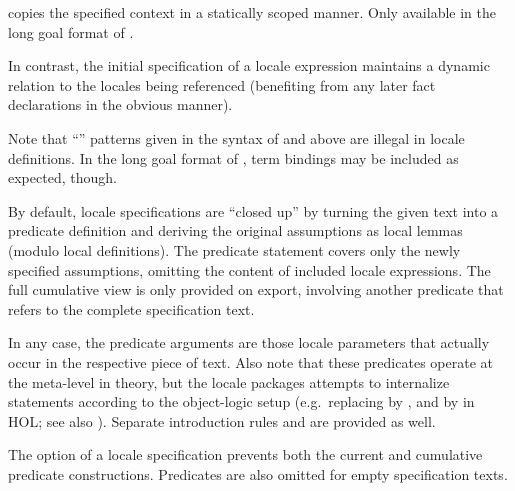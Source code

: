 \begin{isabellebody}
\begin{isamarkuptext}
\begin{descr}
\begin{descr}
  \item [\mbox{\isa{\isakeyword{includes}}}~\isa{c}] copies the specified context
  in a statically scoped manner.  Only available in the long goal
  format of .

  In contrast, the initial  specification of a locale
  expression maintains a dynamic relation to the locales being
  referenced (benefiting from any later fact declarations in the
  obvious manner).

  \end{descr}
  
  Note that ``'' patterns given
  in the syntax of \mbox{} and \mbox{} above
  are illegal in locale definitions.  In the long goal format of
  , term bindings may be included as expected,
  though.
  
  \medskip By default, locale specifications are ``closed up'' by
  turning the given text into a predicate definition  and deriving the original assumptions as local lemmas
  (modulo local definitions).  The predicate statement covers only the
  newly specified assumptions, omitting the content of included locale
  expressions.  The full cumulative view is only provided on export,
  involving another predicate  that refers to the complete
  specification text.
  
  In any case, the predicate arguments are those locale parameters
  that actually occur in the respective piece of text.  Also note that
  these predicates operate at the meta-level in theory, but the locale
  packages attempts to internalize statements according to the
  object-logic setup (e.g.\ replacing \isa{{\isasymAnd}} by \isa{{\isasymforall}}, and
  \isa{{\isachardoublequote}{\isasymLongrightarrow}{\isachardoublequote}} by \isa{{\isachardoublequote}{\isasymlongrightarrow}{\isachardoublequote}} in HOL; see also
  ).  Separate introduction rules  and  are provided as well.
  
  The  option of a locale specification prevents both
  the current  and cumulative  predicate
  constructions.  Predicates are also omitted for empty specification
  texts.


\end{descr}
\end{isamarkuptext}
\end{isabellebody}
